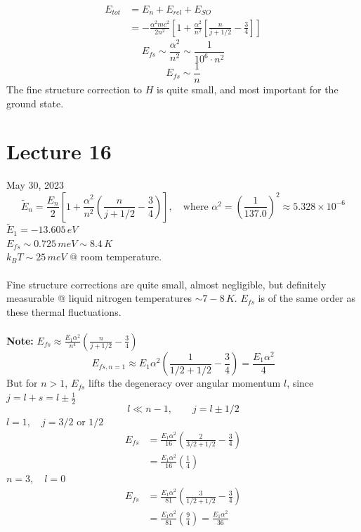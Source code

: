 \documentclass[12pt,fancychapters]{report}
\numberwithin{equation}{section}
\begin{document}
\begin{align*}
  E_{tot} &= E_n + E_{rel} +E_{SO}\\
          &= -\frac{\alpha^2mc^2}{2n^2}\left[1+\frac{\alpha^2}{n^2}\left[
          \frac{n}{j+1/2}-\frac{3}{4}\right]\right]
\end{align*}
\[
  E_{fs}\sim \frac{\alpha^2}{n^2} \sim \frac{1}{10^6\cdot n^2}
\]
\[E_{fs} \sim \frac{1}{n}\]
The fine structure correction to $H$ is quite small, and most important for the ground state.
\newpage
\section{Lecture 16}
May 30, 2023
\[
  \tilde{E}_n = \frac{E_n}{2} \left[1 + \frac{\alpha^2}{n^2} \left(\frac{n}{j+1/2} -
  \frac{3}{4}\right)\right],\quad \text{where}\,\,\alpha^2=\left(\frac{1}{137.0}\right)^2
\approx 5.328\times 10^{-6}
\]
$\tilde{E}_1 = -13.605\,eV$\\
$E_{fs} \sim 0.725\,meV \sim 8.4\,K$\\
$k_BT \sim 25\,meV$ @ room temperature.\\
\\
Fine structure corrections are quite small, almost negligible, but definitely measurable @ 
liquid nitrogen temperatures $\sim 7-8\,K$. $E_{fs}$ is of the same order as these thermal
fluctuations.\\
\\
\textbf{Note:} $E_{fs} \approx \frac{E_1 \alpha^2}{n^4}\left(\frac{n}{j+1/2} - \frac{3}{4}
\right)$
\[
  E_{fs,n=1} \approx E_1\alpha^2\left(\frac{1}{1/2 + 1/2} - \frac{3}{4}\right) = 
  \frac{E_1 \alpha^2}{4}
\]
But for $n>1$, $E_{fs}$ lifts the degeneracy over angular momentum $l$, 
since $j = l+s = l\pm \frac{1}{2}$
\[
  l\ll  n-1, \qquad j = l \pm 1/2
\]
$l=1,\quad j=3/2$ or $1/2$
\begin{align*}
  E_{fs} &= \frac{E_1\alpha^2}{16}\left(\frac{2}{3/2+1/2} - \frac{3}{4}\right)\\
         &= \frac{E_1 \alpha^2}{16}\left(\frac{1}{4}\right)
\end{align*}
$n=3,\quad l=0$
\begin{align*}
  E_{fs} &= \frac{E_1\alpha^2}{81}\left(\frac{3}{1/2+1/2}-\frac{3}{4}\right)\\
         &= \frac{E_1 \alpha^2}{81}\left(\frac{9}{4}\right) = \frac{E_1\alpha^2}{36}
\end{align*}
\end{document}
